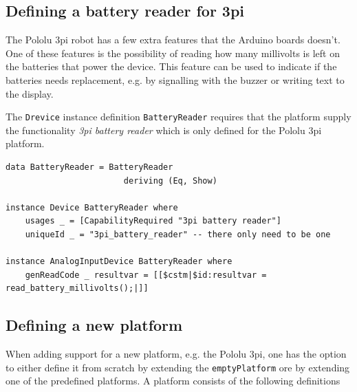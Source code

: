 \documentclass[a4paper, oneside, final]{memoir}
\begin{document}
\subsection{Defining a battery reader for 3pi}

The Pololu 3pi robot has a few extra features that the Arduino boards
doesn't. One of these features is the possibility of reading how many millivolts
is left on the batteries that power the device. This feature can be used to
indicate if the batteries needs replacement, e.g. by signalling with the buzzer
or writing text to the display.

The \texttt{Drevice} instance definition \texttt{BatteryReader} requires that the
platform supply the functionality \textit{3pi battery reader} which is only
defined for the Pololu 3pi platform.

\begin{verbatim}
data BatteryReader = BatteryReader
                        deriving (Eq, Show)

instance Device BatteryReader where
    usages _ = [CapabilityRequired "3pi battery reader"]
    uniqueId _ = "3pi_battery_reader" -- there only need to be one

instance AnalogInputDevice BatteryReader where
    genReadCode _ resultvar = [[$cstm|$id:resultvar = read_battery_millivolts();|]]
\end{verbatim}


\subsection{Defining a new platform}

When adding support for a new platform, e.g. the Pololu 3pi, one has the option
to either define it from scratch by extending the \texttt{emptyPlatform} ore by
extending one of the predefined platforms. A platform consists of the following
definitions
\end{document}
